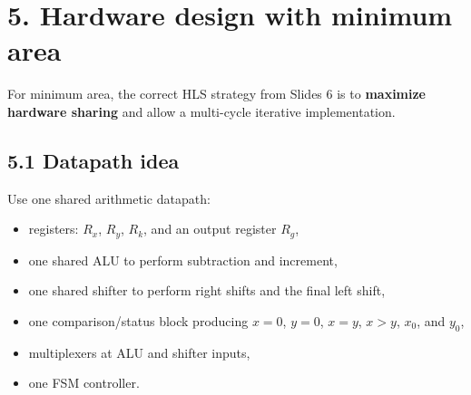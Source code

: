 \documentclass[11pt,a4paper]{article}
\begin{document}
\section*{5. Hardware design with minimum area}
For minimum area, the correct HLS strategy from Slides 6 is to \textbf{maximize hardware sharing} and allow a multi-cycle iterative implementation.

\subsection*{5.1 Datapath idea}
Use one shared arithmetic datapath:
\begin{itemize}
  \item registers: $R_x$, $R_y$, $R_k$, and an output register $R_g$,
  \item one shared ALU to perform subtraction and increment,
  \item one shared shifter to perform right shifts and the final left shift,
  \item one comparison/status block producing $x=0$, $y=0$, $x=y$, $x>y$, $x_0$, and $y_0$,
  \item multiplexers at ALU and shifter inputs,
  \item one FSM controller.
\end{itemize}
\end{document}
